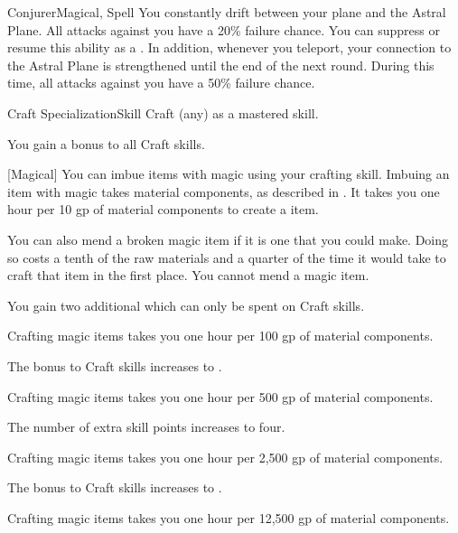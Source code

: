 \begin{feat}{Conjurer}{Magical, Spell}
         You constantly drift between your plane and the Astral Plane.
        All attacks against you have a 20\% failure chance.
        You can suppress or resume this ability as a .
        In addition, whenever you teleport, your connection to the Astral Plane is strengthened until the end of the next round.
        During this time, all attacks against you have a 50\% failure chance.
    \end{feat}

    \begin{feat}{Craft Specialization}{Skill}
        \featpre Craft (any) as a mastered skill.
        \featben

         You gain a  bonus to all Craft skills.

        [Magical] You can imbue items with magic using your crafting skill.
        Imbuing an item with magic takes material components, as described in .
        It takes you one hour per 10 gp of material components to create a item.

        You can also mend a broken magic item if it is one that you could make.
        Doing so costs a tenth of the raw materials and a quarter of the time it would take to craft that item in the first place.
        You cannot mend a  magic item.

         You gain two additional  which can only be spent on Craft skills.

         Crafting magic items takes you one hour per 100 gp of material components.

         The bonus to Craft skills increases to .

         Crafting magic items takes you one hour per 500 gp of material components.

         The number of extra skill points increases to four.

         Crafting magic items takes you one hour per 2,500 gp of material components.

         The bonus to Craft skills increases to .

         Crafting magic items takes you one hour per 12,500 gp of material components.
    \end{feat}

